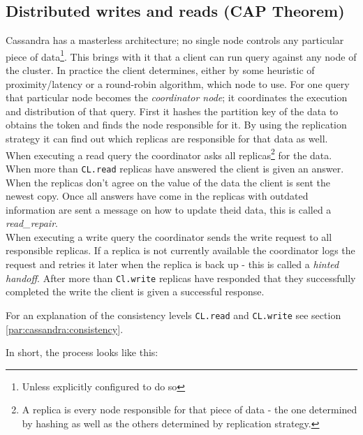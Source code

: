 \subsection{Distributed writes and reads (CAP Theorem)}

Cassandra has a masterless architecture; no single node controls any particular piece of data\footnote{Unless explicitly configured to do so}. This brings with it that a client can run query against any node of the cluster. In practice the client determines, either by some heuristic of proximity/latency or a round-robin algorithm, which node to use.
For one query that particular node becomes the \textit{coordinator node}; it coordinates the execution and distribution of that query.
First it hashes the partition key of the data to obtains the token and finds the node responsible for it. By using the replication strategy it can find out which replicas are responsible for that data as well. \\
When executing a read query the coordinator asks all replicas\footnote{A replica is every node responsible for that piece of data - the one determined by hashing as well as the others determined by replication strategy.} for the data. When more than \texttt{CL.read} replicas have answered the client is given an answer. When the replicas don't agree on the value of the data the client is sent the newest copy. Once all answers have come in the replicas with outdated information are sent a message on how to update theid data, this is called a \textit{read\_repair}. \\
When executing a write query the coordinator sends the write request to all responsible replicas. If a replica is not currently available the coordinator logs the request and retries it later when the replica is back up  - this is called a \textit{hinted handoff}. After more than \texttt{Cl.write} replicas have responded that they successfully completed the write the client is given a successful response.

For an explanation of the consistency levels \texttt{CL.read} and \texttt{CL.write} see section \ref{par:cassandra:consistency}.

In short, the process looks like this:

